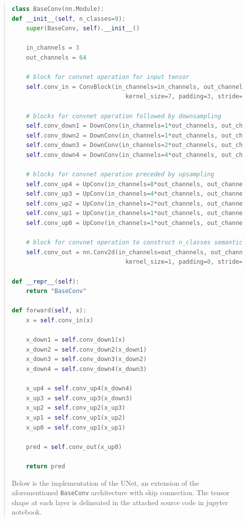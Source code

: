 \documentclass[11pt]{article}
\begin{document}
\begin{quote}
\begin{lstlisting}[language=Python, basicstyle=\scriptsize]
class BaseConv(nn.Module):
def __init__(self, n_classes=9):
    super(BaseConv, self).__init__()

    in_channels = 3
    out_channels = 64

    # block for convnet operation for input tensor
    self.conv_in = ConvBlock(in_channels=in_channels, out_channels=out_channels, 
                                kernel_size=7, padding=3, stride=2)

    # blocks for convnet operation followed by downsampling
    self.conv_down1 = DownConv(in_channels=1*out_channels, out_channels=1*out_channels)
    self.conv_down2 = DownConv(in_channels=1*out_channels, out_channels=2*out_channels)
    self.conv_down3 = DownConv(in_channels=2*out_channels, out_channels=4*out_channels)
    self.conv_down4 = DownConv(in_channels=4*out_channels, out_channels=8*out_channels)

    # blocks for convnet operation preceded by upsampling
    self.conv_up4 = UpConv(in_channels=8*out_channels, out_channels=4*out_channels)
    self.conv_up3 = UpConv(in_channels=4*out_channels, out_channels=2*out_channels)
    self.conv_up2 = UpConv(in_channels=2*out_channels, out_channels=1*out_channels)
    self.conv_up1 = UpConv(in_channels=1*out_channels, out_channels=1*out_channels)
    self.conv_up0 = UpConv(in_channels=1*out_channels, out_channels=1*out_channels)
    
    # block for convnet operation to construct n_classes semantic outputs
    self.conv_out = nn.Conv2d(in_channels=out_channels, out_channels=n_classes, 
                                kernel_size=1, padding=0, stride=1)

def __repr__(self):
    return "BaseConv"
    
def forward(self, x):
    x = self.conv_in(x)
    
    x_down1 = self.conv_down1(x)
    x_down2 = self.conv_down2(x_down1)
    x_down3 = self.conv_down3(x_down2)
    x_down4 = self.conv_down4(x_down3)
    
    x_up4 = self.conv_up4(x_down4)
    x_up3 = self.conv_up3(x_down3)
    x_up2 = self.conv_up2(x_up3)
    x_up1 = self.conv_up1(x_up2)
    x_up0 = self.conv_up1(x_up1)

    pred = self.conv_out(x_up0)

    return pred
\end{lstlisting}

Below is the implementation of the UNet, an extension of the aforementioned \texttt{BaseConv} architecture with skip connection. The tensor shape at each layer is delineated in the attached source code in jupyter notebook.


\end{quote}
\end{document}

